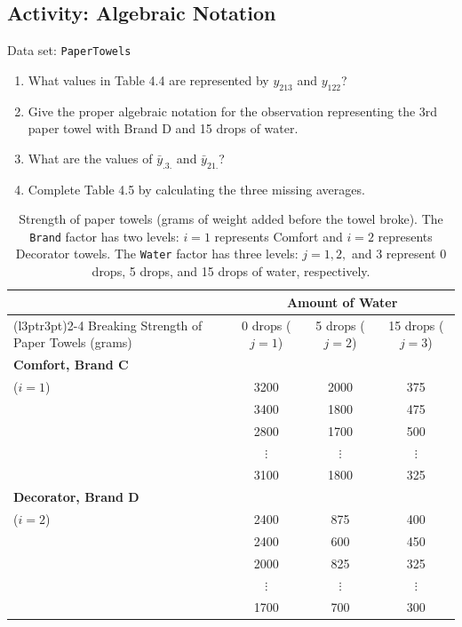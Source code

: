 \documentclass[
]{book}
\providecommand{\tightlist}{%
  \setlength{\itemsep}{0pt}\setlength{\parskip}{0pt}}
\begin{document}
\hypertarget{activity-algebraic-notation}{%
\subsection*{Activity: Algebraic Notation}\label{activity-algebraic-notation}}

Data set: \texttt{PaperTowels}

\begin{enumerate}
\def\labelenumi{\arabic{enumi}.}
\setcounter{enumi}{19}
\tightlist
\item
  What values in Table 4.4 are represented by \(y_{213}\) and \(y_{122}\)?
\item
  Give the proper algebraic notation for the observation representing the 3rd paper towel with Brand D
  and 15 drops of water.
\item
  What are the values of \(\bar{y}_{.3.}\) and \(\bar{y}_{21.}\)?
\item
  Complete Table 4.5 by calculating the three missing averages.
\end{enumerate}

\begin{table}[!h]
\centering
\caption{\label{tab:tab44}Strength of paper towels (grams of weight added before the towel broke). The \texttt{Brand} factor has two levels: $i = 1$ represents Comfort and $i = 2$ represents Decorator towels. The \texttt{Water} factor has three levels: $j = 1, 2,$ and 3 represent 0 drops, 5 drops, and 15 drops of water, respectively.}
\centering
\begin{tabular}[t]{>{\raggedright\arraybackslash}p{3.5cm}ccc}
\toprule
\multicolumn{1}{c}{ } & \multicolumn{3}{c}{Amount of Water} \\
\cmidrule(l{3pt}r{3pt}){2-4}
Breaking Strength of Paper Towels (grams) & 0 drops ($j=1$) & 5 drops ($j=2$) & 15 drops ($j=3$)\\
\midrule
\textbf{Comfort, Brand C} \\ ($i = 1$) & 3200 & 2000 & 375\\
 & 3400 & 1800 & 475\\
 & 2800 & 1700 & 500\\
 & $\vdots$ & $\vdots$ & \vphantom{1} $\vdots$\\
 & 3100 & 1800 & 325\\
\addlinespace
\textbf{Decorator, Brand D} \\ ($i = 2$) & 2400 & 875 & 400\\
 & 2400 & 600 & 450\\
 & 2000 & 825 & 325\\
 & $\vdots$ & $\vdots$ & $\vdots$\\
 & 1700 & 700 & 300\\
\bottomrule
\end{tabular}
\end{table}
\end{document}
